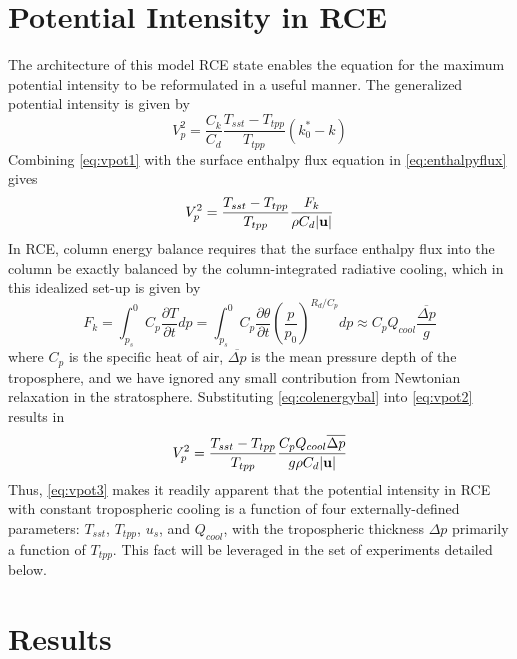 \documentclass[12pt]{article}
\begin{document}
\section{Potential Intensity in RCE}
The architecture of this model RCE state enables the equation for the maximum potential intensity to be reformulated in a useful manner. The generalized potential intensity \citep{Emanuel_2010} is given by
\begin{equation}
\label{eq:vpot1}
V^2_p = \frac{C_k}{C_d}\frac{T_{sst} - T_{tpp}}{T_{tpp}}(k^*_0-k)
\end{equation}
Combining \eqref{eq:vpot1} with the surface enthalpy flux equation in \eqref{eq:enthalpyflux} gives
\begin{equation}
\label{eq:vpot2}
V^2_p = \frac{T_{sst} - T_{tpp}}{T_{tpp}}\frac{F_k}{\rho C_d |{\bf u}|}
\end{equation}
In RCE, column energy balance requires that the surface enthalpy flux into the column be exactly balanced by the column-integrated radiative cooling, which in this idealized set-up is given by
\begin{equation}
\label{eq:colenergybal}
F_k = \int^0_{p_s}{C_p\frac{\partial T}{\partial t}}dp = \int^0_{p_s}{C_p\frac{\partial \theta}{\partial t}\left(\frac{p}{p_0}\right)^{R_d/C_p}}dp\approx C_p Q_{cool} \frac{\overline{\Delta p}}{g}
\end{equation}
where $C_p$ is the specific heat of air, $\overline{\Delta p}$ is the mean pressure depth of the troposphere, and we have ignored any small contribution from Newtonian relaxation in the stratosphere.  Substituting \eqref{eq:colenergybal} into \eqref{eq:vpot2} results in
\begin{equation}
\label{eq:vpot3}
V^2_p = \frac{T_{sst} - T_{tpp}}{T_{tpp}}\frac{C_p Q_{cool} \overline{ \Delta p}}{g \rho C_d |{\bf u}|}
\end{equation}
Thus, \eqref{eq:vpot3} makes it readily apparent that the potential intensity in RCE with constant tropospheric cooling is a function of four externally-defined parameters: $T_{sst}$, $T_{tpp}$, $u_s$, and $Q_{cool}$, with the tropospheric thickness $\Delta p$ primarily a function of $T_{tpp}$. This fact will be leveraged in the set of experiments detailed below.


\section{Results} \label{sec: Results}

\end{document}

